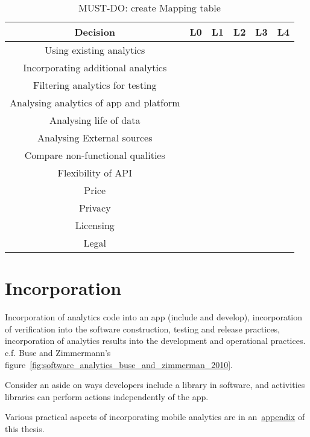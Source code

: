 \begin{table}\begin{tabular}{|c|c|c|c|c|c|}\hline
Decision & L0 & L1 & L2 & L3 & L4 \\\hline
Using existing analytics &  &  &  &  & \\
Incorporating additional analytics & & & & & \\ 
Filtering analytics for testing & & & & & \\
Analysing analytics of app and platform & & & & & \\ 
Analysing life of data  & & & & & \\
Analysing External sources & & & & & \\\hline
Compare non-functional qualities & & & & & \\
Flexibility of API & & & & & \\
Price & & & & & \\
Privacy & & & & & \\
Licensing & & & & & \\
Legal & & & & & \\\hline
\end{tabular}\caption{MUST-DO: create Mapping table}\label{tab:my_label}
\end{table}

\section{Incorporation}
Incorporation of analytics code into an app (include and develop), incorporation of verification into the software construction, testing and release practices, incorporation of analytics results into the development and operational practices. c.f. Buse and Zimmermann's figure~\ref{fig:software_analytics_buse_and_zimmerman_2010}.

Consider an aside on ways developers include a library in software, and activities libraries can perform actions independently of the app. 

Various practical aspects of incorporating mobile analytics are in an~\href{practical-aspects-appendix}{appendix} of this thesis.  


